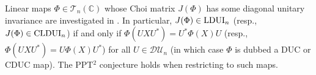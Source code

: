 \documentclass[11pt]{article}
\makeatletter
\newcommand{\C}{\ensuremath{\mathbb{C}}} %
\newcommand{\MT}{{\mathcal T}}
\newcommand{\MDU}{{\mathcal {DU}}}
\newcommand{\SEP}{\text{\rm SEP}}
\newcommand{\CLDUI}{\text{\rm CLDUI}}
\newcommand{\LDUI}{\text{\rm LDUI}}
\newcommand{\ot}{\otimes}
\theoremstyle{plain}
\renewenvironment{proof}[1][\proofname]{%
  \par
  \pushQED{}%
  \normalfont
  \topsep6\p@\@plus6\p@
  \trivlist
  \item[\hskip\labelsep\itshape #1\@addpunct{.}]%
}{%
  \popQED
  \endtrivlist
}
\makeatother
\begin{document}

Linear maps $\Phi\in \MT_n(\C)$ whose Choi matrix $J(\Phi)$ has some diagonal unitary invariance are investigated in \cite{SN-CLDUI,Singh-Nechita-PPT2}. In particular, $J(\Phi)\in \LDUI_n$ (resp., $J(\Phi)\in \CLDUI_n$) if and only if $\Phi(UXU^*) = U^*\Phi(X)U$ (resp., $\Phi(UXU^*)=U\Phi(X)U^*$) for all $U\in\MDU_n$ (in which case $\Phi$ is dubbed a DUC or CDUC map). The PPT$^2$ conjecture holds when restricting to such maps. 
\end{document}

